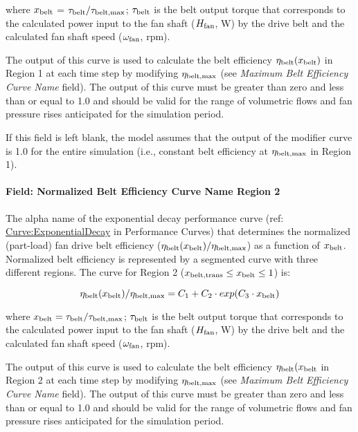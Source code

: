 where \(x_{\rm{belt}}\) = \(\tau_{\rm{belt}} / \tau_{\rm{belt, max}}\); \(\tau_{\rm{belt}}\) is the belt output torque that corresponds to the calculated power input to the fan shaft (\(H_{\rm{fan}}\), W) by the drive belt and the calculated fan shaft speed (\(\omega_{\rm{fan}}\), rpm).

The output of this curve is used to calculate the belt efficiency \(\eta_{\rm{belt}} (x_{\rm{belt}})\) in Region 1 at each time step by modifying \(\eta_{\rm{belt, max}}\) (see \emph{Maximum Belt Efficiency Curve Name} field). The output of this curve must be greater than zero and less than or equal to 1.0 and should be valid for the range of volumetric flows and fan pressure rises anticipated for the simulation period.

If this field is left blank, the model assumes that the output of the modifier curve is 1.0 for the entire simulation (i.e., constant belt efficiency at \(\eta_{\rm{belt, max}}\) in Region 1).

\paragraph{Field: Normalized Belt Efficiency Curve Name Region 2}\label{field-normalized-belt-efficiency-curve-name-region-2}

The alpha name of the exponential decay performance curve (ref: \hyperref[curveexponentialdecay]{Curve:ExponentialDecay} in Performance Curves) that determines the normalized (part-load) fan drive belt efficiency (\(\eta_{\rm{belt}} (x_{\rm{belt}}) / \eta_{\rm{belt, max}}\)) as a function of \(x_{\rm{belt}}\). Normalized belt efficiency is represented by a segmented curve with three different regions. The curve for Region 2 (\(x_{\rm{belt, trans}} \le x_{\rm{belt}} \le 1\)) is:

\begin{equation}
  \eta_{\rm{belt}} (x_{\rm{belt}}) / \eta_{\rm{belt, max}} = C_1 + C_2 \cdot exp(C_3 \cdot x_{\rm{belt}})
\end{equation}

where \(x_{\rm{belt}} = \tau_{\rm{belt}} / \tau_{\rm{belt, max}}\); \(\tau_{\rm{belt}}\) is the belt output torque that corresponds to the calculated power input to the fan shaft (\(H_{\rm{fan}}\), W) by the drive belt and the calculated fan shaft speed (\(\omega_{\rm{fan}}\), rpm).

The output of this curve is used to calculate the belt efficiency \(\eta_{\rm{belt}} (x_{\rm{belt}}\) in Region 2 at each time step by modifying \(\eta_{\rm{belt, max}}\) (see \emph{Maximum Belt Efficiency Curve Name} field). The output of this curve must be greater than zero and less than or equal to 1.0 and should be valid for the range of volumetric flows and fan pressure rises anticipated for the simulation period.

